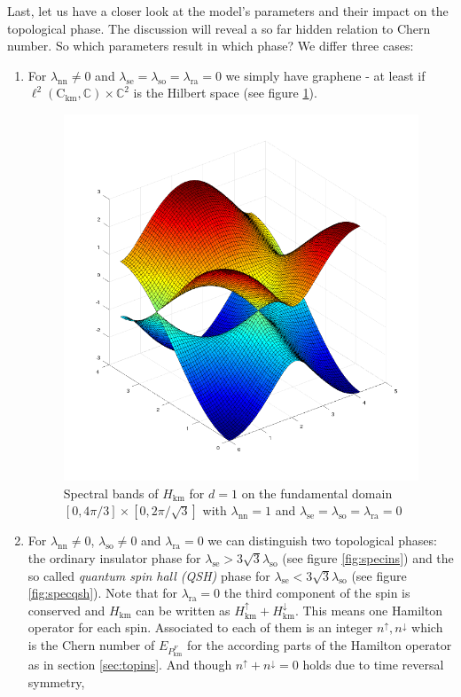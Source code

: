 Last, let us have a closer look at the model's parameters and their impact on the topological phase. The discussion will reveal a so far hidden relation to Chern number. So which parameters result in which phase? We differ three cases:
\begin{enumerate}
\item
  For $\lambda_{\textrm{nn}} \neq 0$ and $\lambda_{\textrm{se}} = \lambda_{\textrm{so}} = \lambda_{\textrm{ra}} = 0$ we simply have graphene - at least if $\ell^{2}(\mathrm{C}_{\textrm{km}},\mathbb{C}) \times \mathbb{C}^{2}$ is the Hilbert space (see figure \ref{fig:specgraph}).
\begin{figure}[H]
\includegraphics[scale=0.4]{graphics/specgraph.png}
\caption{Spectral bands of $H_{\textrm{km}}$ for $d = 1$ on the fundamental domain $[0,4\pi/3] \times [0,2\pi/\sqrt{3}]$ with $\lambda_{\textrm{nn}} = 1$ and $\lambda_{\textrm{se}} = \lambda_{\textrm{so}} = \lambda_{\textrm{ra}} = 0$}
\label{fig:specgraph}
\end{figure}
\item
   For $\lambda_{\textrm{nn}} \neq 0$, $\lambda_{\textrm{so}} \neq 0$ and $\lambda_{\textrm{ra}} = 0$ we can distinguish two topological phases: the ordinary insulator phase for $\lambda_{\textrm{se}} > 3\sqrt{3}\lambda_{\textrm{so}}$ (see figure \ref{fig:specins}) and the so called \textit{quantum spin hall (QSH)} phase for $\lambda_{\textrm{se}} < 3\sqrt{3}\lambda_{\textrm{so}}$ (see figure \ref{fig:specqsh}). Note that for $\lambda_{\textrm{ra}} = 0$ the third component of the spin is conserved and $H_{\textrm{km}}$ can be written as $H_{\textrm{km}}^{\uparrow} + H_{\textrm{km}}^{\downarrow}$. This means one Hamilton operator for each spin. Associated to each of them is an integer $n^{\uparrow},n^{\downarrow}$ which is the Chern number of $E_{P_{\textrm{km}}^{F}}$ for the according parts of the Hamilton operator as in section \ref{sec:topins}. And though $n^{\uparrow} + n^{\downarrow} = 0$ holds due to time reversal symmetry,

\end{enumerate}
